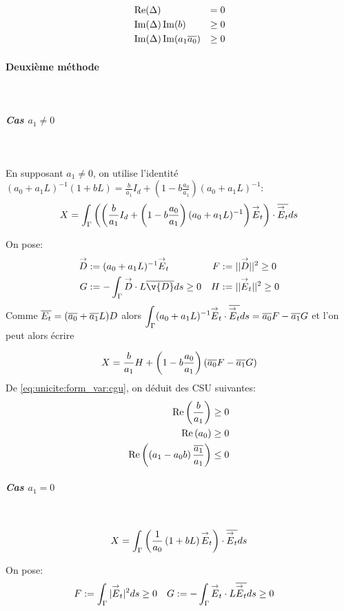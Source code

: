       \begin{align}
        &\operatorname{Re}(\Delta) &= 0\\
        &\operatorname{Im}(\Delta)\operatorname{Im}(b) &\ge 0\\
        &\operatorname{Im}(\Delta)\operatorname{Im}(a_1{\overline{a_0}})&\ge 0
      \end{align}

    \paragraph{Deuxième méthode}
      ~
      \subparagraph{Cas \(a_1\not=0\)}
        ~

        En supposant \(a_1 \not=0\), on utilise l'identité \((a_0 + a_1 L)^{-1}(1 + b L)  = \frac{b}{a_1} I_d + \left(1-b\frac{a_0}{a_1}\right)(a_0+a_1L)^{-1}\):
        \[
          X = \int_\Gamma \left(\left(\dfrac{b}{a_1} I_d + \left(1-b\dfrac{a_0}{a_1}\right)(a_0+a_1L)^{-1}\right){\overset{\rightarrow}{E}}_t\right) \cdot {\overline{{\overset{\rightarrow}{E}}_t}} ds
        \]

        On pose:
        \begin{align*}
          \vect D &:= (a_0 + a_1 L)^{-1}\vE_t & F&:= || \vect D || ^2 \ge 0  \\
          G&:= -\int_\Gamma \vect D \cdot L\conj{\v{D}} ds \ge 0 & H &:= || \vE_t || ^2 \ge 0
        \end{align*}
        Comme \({\overline{E_t}} = ({\overline{a_0}} + {\overline{a_1}}L)D\) alors \(\displaystyle\int_\Gamma (a_0 +a_1 L) ^{-1}{\overset{\rightarrow}{E}}_t\cdot {\overline{{\overset{\rightarrow}{E}}_t}} ds = {\overline{a_0}} F - {\overline{a_1}} G\) et l'on peut alors écrire

        \begin{equation}
          \label{eq:unicite:form_var:decomp_cgu_ci1_a1}
          X = \dfrac{b}{a_1}H   + \left(1-b\dfrac{a_0}{a_1}\right)\left({\overline{a_0}} F - {\overline{a_1}} G\right)
        \end{equation}
        De \eqref{eq:unicite:form_var:cgu}, on déduit des CSU suivantes:
        \begin{align}
          \operatorname{Re}\left(\dfrac{b}{a_1}\right) \ge 0 \\
          \operatorname{Re}\left(a_0\right) \ge 0 \\
          \operatorname{Re}\left(\left(a_1-a_0 b\right)\dfrac{{\overline{a_1}}}{a_1}\right) \le 0
        \end{align}

      \subparagraph{Cas \(a_1=0\)}
        ~
        \[
          X = \int_\Gamma \left( \dfrac{1}{a_0}\left(1+bL\right){\overset{\rightarrow}{E}}_t\right) \cdot {\overline{{\overset{\rightarrow}{E}}_t}} ds
        \]

        On pose:
        \begin{align*}
          F&:= \int_\Gamma | {\overset{\rightarrow}{E}}_t | ^2 ds \ge 0 & G &:= -\int_\Gamma {\overset{\rightarrow}{E}}_t \cdot L{\overline{{\overset{\rightarrow}{E}}_t}} ds \ge 0
        \end{align*}

